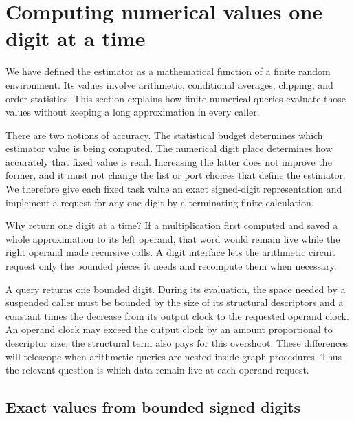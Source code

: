 \section{Computing numerical values one digit at a time}
\label{sec:arith}

We have defined the estimator as a mathematical function of a finite random environment. Its values involve arithmetic, conditional averages, clipping, and order statistics. This section explains how finite numerical queries evaluate those values without keeping a long approximation in every caller.

There are two notions of accuracy. The statistical budget determines which estimator value is being computed. The numerical digit place determines how accurately that fixed value is read. Increasing the latter does not improve the former, and it must not change the list or port choices that define the estimator. We therefore give each fixed task value an exact signed-digit representation and implement a request for any one digit by a terminating finite calculation.

Why return one digit at a time? If a multiplication first computed and saved a whole approximation to its left operand, that word would remain live while the right operand made recursive calls. A digit interface lets the arithmetic circuit request only the bounded pieces it needs and recompute them when necessary.

A query returns one bounded digit.  During its evaluation, the space
needed by a suspended caller must be bounded by the size of its
structural descriptors and a constant times the decrease from its
output clock to the requested operand clock.  An operand clock may
exceed the output clock by an amount proportional to descriptor size;
the structural term also pays for this overshoot.  These differences
will telescope when arithmetic queries are nested inside graph procedures.
Thus the relevant question is which data remain live at each operand request.

\subsection{Exact values from bounded signed digits}

